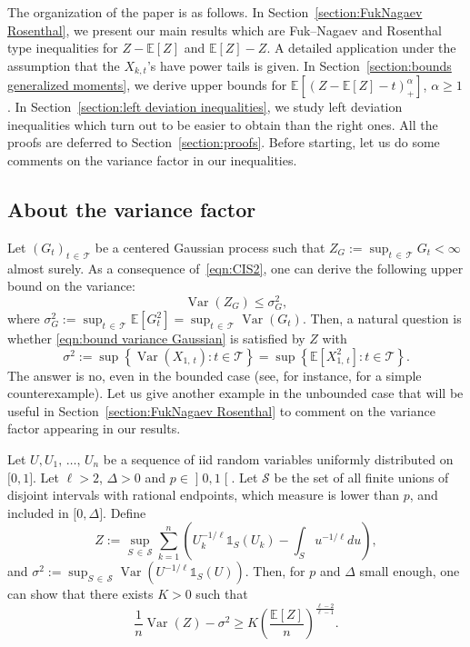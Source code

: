 \documentclass[AHL,Unicode,longabstracts,published]{cedram}
\DeclareMathOperator{\Var}{Var}
\newcommand{\bE}{\mathbb{E}}
\newcommand{\cS}{\mathcal{S}}
\newcommand{\cT}{\mathcal{T}}
\newcommand{\intervalleoo}[2]{\mathopen{]} #1\mathclose{}\mathpunct{},#2\mathclose{[}}
\newcommand{\intervalleff}[2]{\mathopen{[} #1\mathclose{}\mathpunct{},#2\mathclose{]}}
\newcommand{\ind}{\mathds{1}}
\begin{document}
The organization of the paper is as follows. In Section~\ref{section:FukNagaev Rosenthal}, we present our main results which are Fuk--Nagaev and Rosenthal type inequalities for $Z-\bE[Z]$ and $\bE[Z]-Z$. A detailed application under the assumption that the $X_{k,t}$'s have power tails is given. In Section~\ref{section:bounds generalized moments}, we derive upper bounds for $\bE[(Z-\bE[Z]-t)_+^\alpha]$, $\alpha\geq 1$. In Section~\ref{section:left deviation inequalities}, we study left deviation inequalities which turn out to be easier to obtain than the right ones. All the proofs are deferred to Section~\ref{section:proofs}. Before starting, let us do some comments on the variance factor in our inequalities.

\subsection{About the variance factor}\label{sect1.3}
Let $(G_t)_{t\,\in\,\cT}$ be a centered Gaussian process such that $Z_G:=\sup_{t\,\in\,\cT}G_t<\infty$ almost surely. As a consequence of~\eqref{eqn:CIS2}, one can derive the following upper bound on the variance:
\begin{equation}\label{eqn:bound variance Gaussian}
\Var(Z_G)\leq \sigma_G^2,
\end{equation}
where $\sigma_G^2:=\sup_{t\,\in\,\cT}\bE[G_t^2]=\sup_{t\,\in\,\cT}\Var(G_t)$. Then, a natural question is whether \eqref{eqn:bound variance Gaussian} is satisfied by $Z$ with
\begin{equation}\label{eqn:def wimpy}
\sigma^2:=\sup\left\{\Var(X_{1,\,t}):t\in\cT\right\}=\sup\left\{\bE\left[X_{1,\,t}^2\right] : t\in\cT\right\}.
\end{equation}
The answer is no, even in the bounded case (see, for instance, \cite[Exercise~11.1]{BLM13} for a simple counterexample). Let us give another example in the unbounded case that will be useful in Section~\ref{section:FukNagaev Rosenthal} to comment on the variance factor appearing in our results.

\begin{exam}\label{example:power type tail}
Let $U,U_1,\,\ldots,\,U_n$ be a sequence of iid random variables uniformly distributed on $\intervalleff 01$. Let $\ell>2$, $\Delta>0$ and $p\in\intervalleoo 01$. Let $\cS$ be the set of all finite unions of disjoint intervals with rational endpoints, which measure is lower than $p$, and included in $\intervalleff{0}{\Delta}$. Define
\[
Z:=\sup_{S\,\in\,\cS}\sum_{k=1}^n \left(U_k^{-1/\ell}\ind_S(U_k)-\int_S u^{-1/\ell}du\right),
\]
and $\sigma^2:=\sup_{S\,\in\,\cS}\Var(U^{-1/\ell}\ind_{S}(U))$. Then, for $p$ and $\Delta$ small enough, one can show that there exists $K>0$ such that
\begin{equation}\label{eqn:example lower bound VarZ}
\frac 1n\Var(Z)-\sigma^2\geq K\left(\frac{\bE[Z]}{n}\right)^{\frac{\ell-2}{\ell-1}}.
\end{equation}
\end{exam}
\end{document}
